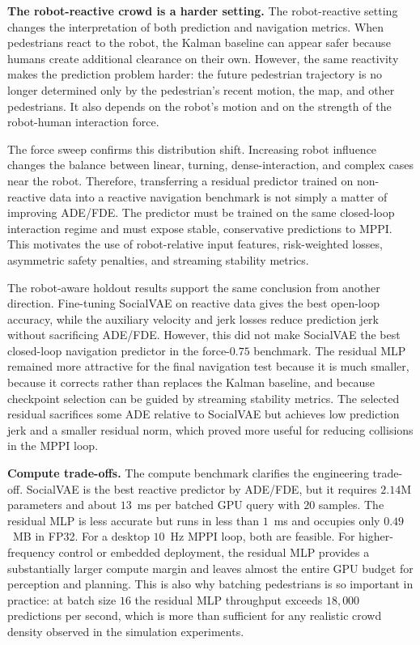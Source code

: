 \documentclass[12pt, a4paper]{article}
\begin{document}
\textbf{The robot-reactive crowd is a harder setting.} The robot-reactive setting changes the interpretation of both prediction and navigation metrics. When pedestrians react to the robot, the Kalman baseline can appear safer because humans create additional clearance on their own. However, the same reactivity makes the prediction problem harder: the future pedestrian trajectory is no longer determined only by the pedestrian's recent motion, the map, and other pedestrians. It also depends on the robot's motion and on the strength of the robot-human interaction force.

The force sweep confirms this distribution shift. Increasing robot influence changes the balance between linear, turning, dense-interaction, and complex cases near the robot. Therefore, transferring a residual predictor trained on non-reactive data into a reactive navigation benchmark is not simply a matter of improving ADE/FDE. The predictor must be trained on the same closed-loop interaction regime and must expose stable, conservative predictions to MPPI. This motivates the use of robot-relative input features, risk-weighted losses, asymmetric safety penalties, and streaming stability metrics.

The robot-aware holdout results support the same conclusion from another direction. Fine-tuning SocialVAE on reactive data gives the best open-loop accuracy, while the auxiliary velocity and jerk losses reduce prediction jerk without sacrificing ADE/FDE. However, this did not make SocialVAE the best closed-loop navigation predictor in the force-$0.75$ benchmark. The residual MLP remained more attractive for the final navigation test because it is much smaller, because it corrects rather than replaces the Kalman baseline, and because checkpoint selection can be guided by streaming stability metrics. The selected residual sacrifices some ADE relative to SocialVAE but achieves low prediction jerk and a smaller residual norm, which proved more useful for reducing collisions in the MPPI loop.

\textbf{Compute trade-offs.} The compute benchmark clarifies the engineering trade-off. SocialVAE is the best reactive predictor by ADE/FDE, but it requires $2.14$M parameters and about $13$~ms per batched GPU query with $20$ samples. The residual MLP is less accurate but runs in less than $1$~ms and occupies only $0.49$~MB in FP32. For a desktop $10$~Hz MPPI loop, both are feasible. For higher-frequency control or embedded deployment, the residual MLP provides a substantially larger compute margin and leaves almost the entire GPU budget for perception and planning. This is also why batching pedestrians is so important in practice: at batch size $16$ the residual MLP throughput exceeds $18{,}000$ predictions per second, which is more than sufficient for any realistic crowd density observed in the simulation experiments.
\end{document}
